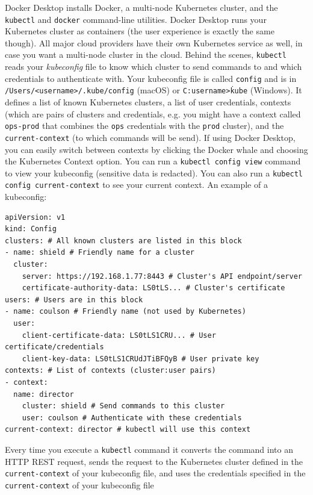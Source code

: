 \documentclass[table, xcdraw]{article}%
\begin{document}
Docker Desktop installs Docker, a multi-node Kubernetes cluster, and the \texttt{kubectl} and \texttt{docker} command-line utilities. Docker Desktop runs your Kubernetes cluster as containers (the user experience is exactly the same though). All major cloud providers have their own Kubernetes service as well, in case you want a multi-node cluster in the cloud. Behind the scenes, \texttt{kubectl} reads your \emph{kubeconfig} file to know which cluster to send commands to and which credentials to authenticate with. Your kubeconfig file is called \texttt{config} and is in \texttt{/Users/<username>/.kube/config} (macOS) or \texttt{C:\Users\<username>\.kube\config} (Windows). It defines a list of known Kubernetes clusters, a list of user credentials, contexts (which are pairs of clusters and credentials, e.g. you might have a context called \texttt{ops-prod} that combines the \texttt{ops} credentials with the \texttt{prod} cluster), and the \texttt{current-context}  (to which commands will be send). If using Docker Desktop, you can easily switch between contexts by clicking the
Docker whale and choosing the Kubernetes Context option. You can run a \texttt{kubectl config view} command to view your kubeconfig (sensitive data is redacted). You can also run a \texttt{kubectl config current-context} to see your current context. An example of a kubeconfig:

\begin{verbatim}
apiVersion: v1
kind: Config
clusters: # All known clusters are listed in this block
- name: shield # Friendly name for a cluster
  cluster:
    server: https://192.168.1.77:8443 # Cluster's API endpoint/server
    certificate-authority-data: LS0tLS... # Cluster's certificate
users: # Users are in this block
- name: coulson # Friendly name (not used by Kubernetes)
  user:
    client-certificate-data: LS0tLS1CRU... # User certificate/credentials
    client-key-data: LS0tLS1CRUdJTiBFQyB # User private key
contexts: # List of contexts (cluster:user pairs)
- context:
  name: director
    cluster: shield # Send commands to this cluster
    user: coulson # Authenticate with these credentials
current-context: director # kubectl will use this context
\end{verbatim}

Every time you execute a \texttt{kubectl} command it converts the command into an HTTP REST request, sends the request to the Kubernetes cluster defined in the \texttt{current-context} of your kubeconfig file, and uses the credentials specified in the \texttt{current-context} of your kubeconfig file
\end{document}

